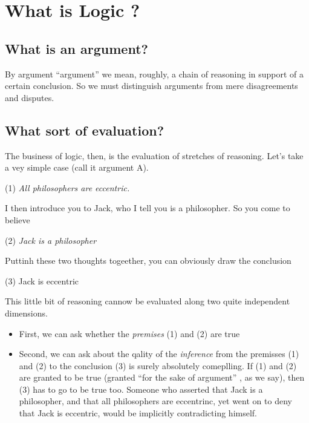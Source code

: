 \documentclass[12pt]{article}
\theoremstyle{definition}
\begin{document}
    \section{What is Logic ?}

    \subsection{What is an argument?}

    By argument ``argument'' we mean, roughly, a chain of reasoning in support of a certain
    conclusion. So we must distinguish arguments from mere disagreements and disputes.\par 

    \subsection{What sort of evaluation?}

    The business of logic, then, is the evaluation of stretches of reasoning. Let's take a vey simple 
    case (call it argument A).\par 

    (1) \textit{All philosophers are eccentric.}\par

    I then introduce you to Jack, who I tell you is a philosopher. So you come to believe\par

    (2) \textit{Jack is a philosopher}\par

    Puttinh these two thoughts togeether, you can obviously draw the conclusion \par 

    (3) Jack is eccentric\par 

    This little bit of reasoning cannow be evaluated along two quite independent dimensions.\par 

    \begin{itemize}
        \item First, we can ask whether the \textit{premises} (1) and (2) are true
        \item Second, we can ask about the qality of the \textit{inference} from the premisses (1) and (2) to the
        conclusion (3)  is surely absolutely comeplling. If (1) and (2) are granted to be true (granted ``for the sake of argument''
        , as we say), then (3) has to go to be true too. Someone who asserted that Jack is a philosopher, and that all philosophers are 
        eccentrinc, yet went on to deny that Jack is eccentric, would be implicitly contradicting himself.
    \end{itemize}
\end{document}
